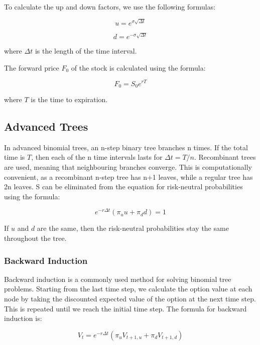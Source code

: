 \documentclass{article}
\theoremstyle{mytheoremstyle}
\theoremstyle{mytheoremstyle}
\theoremstyle{myproblemstyle}
\begin{document}
To calculate the up and down factors, we use the following formulas:

\begin{equation}
u = e^{\sigma\sqrt{\Delta t}}
\end{equation}

\begin{equation}
d = e^{-\sigma\sqrt{\Delta t}}
\end{equation}

where $\Delta t$ is the length of the time interval.

The forward price $F_0$ of the stock is calculated using the formula:

\begin{equation}
F_0 = S_0e^{rT}
\end{equation}

where $T$ is the time to expiration.

\subsection{Advanced Trees}
In advanced binomial trees, an n-step binary tree branches n times. If the total time is $T$, then each of the n time intervals lasts for $\Delta t = T/n$. Recombinant trees are used, meaning that neighbouring branches converge. This is computationally convenient, as a recombinant n-step tree has n+1 leaves, while a regular tree has 2n leaves. S can be eliminated from the equation for risk-neutral probabilities using the formula:

\begin{equation}
e^{-r\Delta t} (\pi_u u + \pi_d d) = 1
\end{equation}

If $u$ and $d$ are the same, then the risk-neutral probabilities stay the same throughout the tree.

\subsubsection{Backward Induction}
Backward induction is a commonly used method for solving binomial tree problems. Starting from the last time step, we calculate the option value at each node by taking the discounted expected value of the option at the next time step. This is repeated until we reach the initial time step. The formula for backward induction is:

\begin{equation}
V_t = e^{-r\Delta t} (\pi_u V_{t+1,u} + \pi_d V_{t+1,d})
\end{equation}
\end{document}
